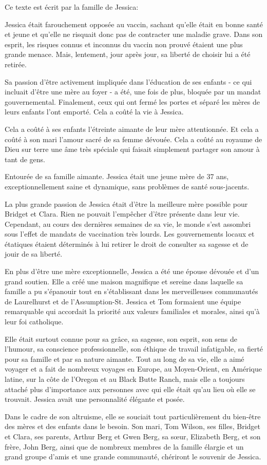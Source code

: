 Ce texte est écrit par la famille de Jessica:

Jessica était farouchement opposée au vaccin, sachant qu'elle était en bonne
santé et jeune et qu'elle ne risquait donc pas de contracter une maladie
grave. Dans son esprit, les risques connus et inconnus du vaccin non prouvé
étaient une plus grande menace. Mais, lentement, jour après jour, sa liberté de
choisir lui a été retirée.

Sa passion d'être activement impliquée dans l'éducation de ses enfants - ce qui
incluait d'être une mère au foyer - a été, une fois de plus, bloquée par un
mandat gouvernemental. Finalement, ceux qui ont fermé les portes et séparé les
mères de leurs enfants l'ont emporté. Cela a coûté la vie à Jessica.

Cela a coûté à ses enfants l'étreinte aimante de leur mère attentionnée. Et cela
a coûté à son mari l'amour sacré de sa femme dévouée. Cela a coûté au royaume de
Dieu sur terre une âme très spéciale qui faisait simplement partager son amour à
tant de gens.

Entourée de sa famille aimante. Jessica était une jeune mère de 37 ans,
exceptionnellement saine et dynamique, sans problèmes de santé sous-jacents.

La plus grande passion de Jessica était d'être la meilleure mère possible pour
Bridget et Clara. Rien ne pouvait l'empêcher d'être présente dans leur
vie. Cependant, au cours des dernières semaines de sa vie, le monde s'est
assombri sous l'effet de mandats de vaccination très lourds. Les gouvernements
locaux et étatiques étaient déterminés à lui retirer le droit de consulter sa
sagesse et de jouir de sa liberté.

En plus d'être une mère exceptionnelle, Jessica a été une épouse dévouée et d'un
grand soutien. Elle a créé une maison magnifique et sereine dans laquelle sa
famille a pu s'épanouir tout en s'établissant dans les merveilleuses communautés
de Laurelhurst et de l'Assumption-St. Jessica et Tom formaient une équipe
remarquable qui accordait la priorité aux valeurs familiales et morales, ainsi
qu'à leur foi catholique.

Elle était surtout connue pour sa grâce, sa sagesse, son esprit, son sens de
l'humour, sa conscience professionnelle, son éthique de travail infatigable, sa
fierté pour sa famille et par sa nature aimante. Tout au long de sa vie, elle a
aimé voyager et a fait de nombreux voyages en Europe, au Moyen-Orient, en
Amérique latine, sur la côte de l'Oregon et au Black Butte Ranch, mais elle a
toujours attaché plus d'importance aux personnes avec qui elle était qu'au lieu
où elle se trouvait. Jessica avait une personnalité élégante et posée.

Dans le cadre de son altruisme, elle se souciait tout particulièrement du
bien-être des mères et des enfants dans le besoin. Son mari, Tom Wilson, ses
filles, Bridget et Clara, ses parents, Arthur Berg et Gwen Berg, sa sœur,
Elizabeth Berg, et son frère, John Berg, ainsi que de nombreux membres de la
famille élargie et un grand groupe d'amis et une grande communauté, chériront le
souvenir de Jessica.

